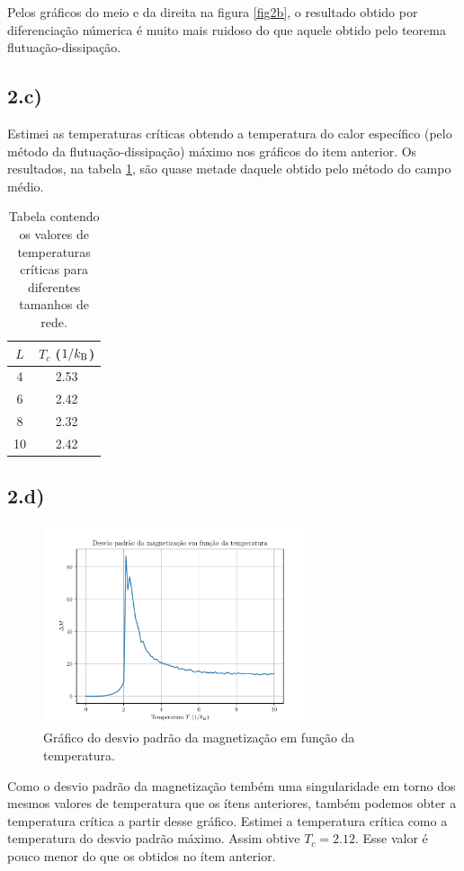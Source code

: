 \documentclass[a4paper, brazil]{article}
\begin{document}
    Pelos gráficos do meio e da direita na figura \ref{fig2b}, o resultado obtido por diferenciação númerica é muito mais ruidoso do que aquele obtido pelo teorema flutuação-dissipação.


\newpage
\subsection*{2.c)}

    Estimei as temperaturas críticas obtendo a temperatura do calor específico (pelo método da flutuação-dissipação) máximo nos gráficos do item anterior.
    Os resultados, na tabela \ref{tabTc}, são quase metade daquele obtido pelo método do campo médio.

    \begin{table}[ht]
        \centering
        \begin{tabular}{c|c}
            \( L \) & \( T_c \) (\( 1 / k_\text{B} \)) \\
            \hline
            4 & \num{2.53} \\
            6 & \num{2.42} \\
            8 & \num{2.32} \\
            10 & \num{2.42}
        \end{tabular}
        \caption{Tabela contendo os valores de temperaturas críticas para diferentes tamanhos de rede.}
        \label{tabTc}
    \end{table}

\newpage
\subsection*{2.d)}

    \begin{figure}[ht]
        \centering
        \includegraphics[width=0.7\textwidth]{fig_2d.pdf}
        \caption{Gráfico do desvio padrão da magnetização em função da temperatura.}\label{fig2d}
    \end{figure}

    Como o desvio padrão da magnetização tembém uma singularidade em torno dos mesmos valores de temperatura que os ítens anteriores, também podemos obter a temperatura crítica a partir desse gráfico.
    Estimei a temperatura crítica como a temperatura do desvio padrão máximo.
    Assim obtive \( T_c = \num{2.12} \).
    Esse valor é pouco menor do que os obtidos no ítem anterior.
\end{document}
